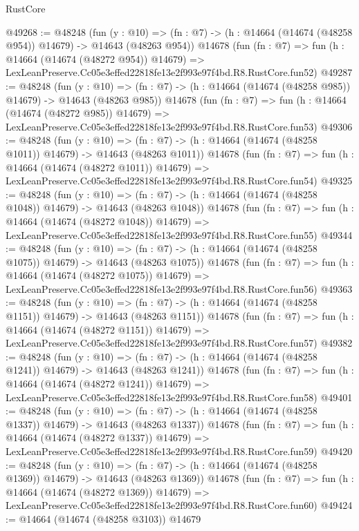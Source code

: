 \begin{lexlean}{RustCore}
\begin{coremodule}
@49268 := @48248
    (fun (y : @10) =>
    (fn : @7) -> (h : @14664 (@14674 (@48258 @954)) @14679) -> @14643 (@48263 @954))
    @14678
    (fun (fn : @7) =>
    fun (h : @14664 (@14674 (@48272 @954)) @14679) =>
    LexLeanPreserve.Cc05e3effed22818fe13e2f993e97f4bd.R8.RustCore.fun52)
@49287 := @48248
    (fun (y : @10) =>
    (fn : @7) -> (h : @14664 (@14674 (@48258 @985)) @14679) -> @14643 (@48263 @985))
    @14678
    (fun (fn : @7) =>
    fun (h : @14664 (@14674 (@48272 @985)) @14679) =>
    LexLeanPreserve.Cc05e3effed22818fe13e2f993e97f4bd.R8.RustCore.fun53)
@49306 := @48248
    (fun (y : @10) =>
    (fn : @7) -> (h : @14664 (@14674 (@48258 @1011)) @14679) -> @14643 (@48263 @1011))
    @14678
    (fun (fn : @7) =>
    fun (h : @14664 (@14674 (@48272 @1011)) @14679) =>
    LexLeanPreserve.Cc05e3effed22818fe13e2f993e97f4bd.R8.RustCore.fun54)
@49325 := @48248
    (fun (y : @10) =>
    (fn : @7) -> (h : @14664 (@14674 (@48258 @1048)) @14679) -> @14643 (@48263 @1048))
    @14678
    (fun (fn : @7) =>
    fun (h : @14664 (@14674 (@48272 @1048)) @14679) =>
    LexLeanPreserve.Cc05e3effed22818fe13e2f993e97f4bd.R8.RustCore.fun55)
@49344 := @48248
    (fun (y : @10) =>
    (fn : @7) -> (h : @14664 (@14674 (@48258 @1075)) @14679) -> @14643 (@48263 @1075))
    @14678
    (fun (fn : @7) =>
    fun (h : @14664 (@14674 (@48272 @1075)) @14679) =>
    LexLeanPreserve.Cc05e3effed22818fe13e2f993e97f4bd.R8.RustCore.fun56)
@49363 := @48248
    (fun (y : @10) =>
    (fn : @7) -> (h : @14664 (@14674 (@48258 @1151)) @14679) -> @14643 (@48263 @1151))
    @14678
    (fun (fn : @7) =>
    fun (h : @14664 (@14674 (@48272 @1151)) @14679) =>
    LexLeanPreserve.Cc05e3effed22818fe13e2f993e97f4bd.R8.RustCore.fun57)
@49382 := @48248
    (fun (y : @10) =>
    (fn : @7) -> (h : @14664 (@14674 (@48258 @1241)) @14679) -> @14643 (@48263 @1241))
    @14678
    (fun (fn : @7) =>
    fun (h : @14664 (@14674 (@48272 @1241)) @14679) =>
    LexLeanPreserve.Cc05e3effed22818fe13e2f993e97f4bd.R8.RustCore.fun58)
@49401 := @48248
    (fun (y : @10) =>
    (fn : @7) -> (h : @14664 (@14674 (@48258 @1337)) @14679) -> @14643 (@48263 @1337))
    @14678
    (fun (fn : @7) =>
    fun (h : @14664 (@14674 (@48272 @1337)) @14679) =>
    LexLeanPreserve.Cc05e3effed22818fe13e2f993e97f4bd.R8.RustCore.fun59)
@49420 := @48248
    (fun (y : @10) =>
    (fn : @7) -> (h : @14664 (@14674 (@48258 @1369)) @14679) -> @14643 (@48263 @1369))
    @14678
    (fun (fn : @7) =>
    fun (h : @14664 (@14674 (@48272 @1369)) @14679) =>
    LexLeanPreserve.Cc05e3effed22818fe13e2f993e97f4bd.R8.RustCore.fun60)
@49424 := @14664 (@14674 (@48258 @3103)) @14679

\end{coremodule}
\end{lexlean}
